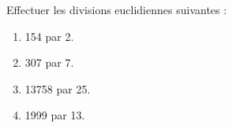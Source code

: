 \begin{exercice*}
   Effectuer les divisions euclidiennes suivantes :
   \begin{multicols}{2}
   \begin{enumerate}
      \item 154 par 2.
      \item 307 par 7.
      \item \num{13758} par 25.
      \item \num{1999} par 13.
   \end{enumerate}
   \end{multicols}
\end{exercice*}
